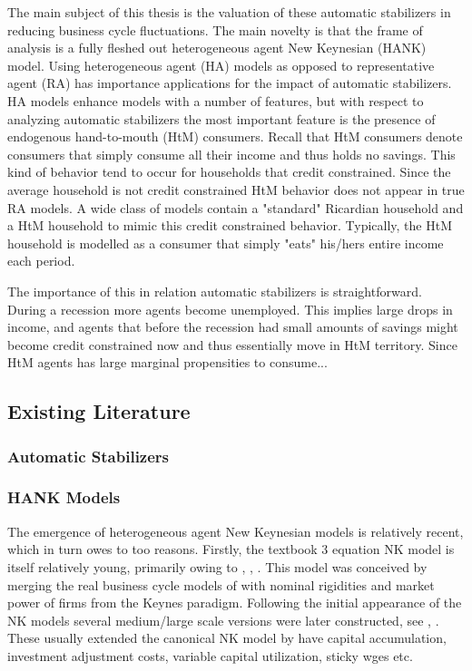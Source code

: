 The main subject of this thesis is the valuation of these automatic stabilizers in reducing business cycle fluctuations. The main novelty is that the frame of analysis is a fully fleshed out heterogeneous agent New Keynesian (HANK) model. Using heterogeneous agent (HA) models as opposed to representative agent (RA) has importance applications for the impact of automatic stabilizers. HA models enhance models with a number of features, but with respect to analyzing automatic stabilizers the most important feature is the presence of endogenous hand-to-mouth (HtM) consumers. Recall that HtM consumers denote consumers that simply consume all their income and thus holds no savings. This kind of behavior tend to occur for households that credit constrained. Since the average household is not credit constrained HtM behavior does not appear in true RA models. A wide class of models contain a "standard" Ricardian household and a HtM household to mimic this credit constrained behavior. Typically, the HtM household is modelled as a consumer that simply "eats" his/hers entire income each period. 

The importance of this in relation automatic stabilizers is straightforward. During a recession more agents become unemployed. This implies large drops in income, and agents that before the recession had small amounts of savings might become credit constrained now and thus essentially move in HtM territory. Since HtM agents has large marginal propensities to consume...





\subsection{Existing Literature}
\subsubsection{Automatic Stabilizers}

\citet{mckay2016role}
\citet{mckay2016optimal}




\subsubsection{HANK Models}
The emergence of heterogeneous agent New Keynesian models is relatively recent, which in turn owes to too reasons. Firstly, the textbook 3 equation NK model is itself relatively young, primarily owing to \citet{goodfriend1997new}, \citet{clarida1999science}, \citet{woodford2003interest}. This model was conceived by merging the real business cycle models of \citet{kydland1982time} with nominal rigidities and market power of firms from the Keynes paradigm. Following the initial appearance of the NK models several medium/large scale versions were later constructed, see \citet{smets2003estimated}, \citet{smets2007shocks}. These usually extended the canonical NK model by have capital accumulation, investment adjustment costs, variable capital utilization, sticky wges etc. 

